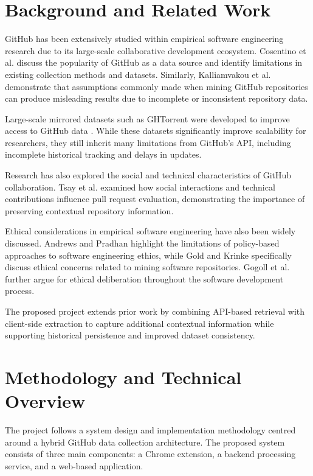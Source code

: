 \documentclass[conference]{IEEEtran}
\begin{document}
\section{Background and Related Work}
GitHub has been extensively studied within empirical software engineering research due to its large-scale collaborative development ecosystem. Cosentino et al. \cite{cosentino2016} discuss the popularity of GitHub as a data source and identify limitations in existing collection methods and datasets. Similarly, Kalliamvakou et al. \cite{kalliamvakou2016} demonstrate that assumptions commonly made when mining GitHub repositories can produce misleading results due to incomplete or inconsistent repository data.

Large-scale mirrored datasets such as GHTorrent were developed to improve access to GitHub data \cite{gousios2017}. While these datasets significantly improve scalability for researchers, they still inherit many limitations from GitHub's API, including incomplete historical tracking and delays in updates.

Research has also explored the social and technical characteristics of GitHub collaboration. Tsay et al. \cite{tsay2014} examined how social interactions and technical contributions influence pull request evaluation, demonstrating the importance of preserving contextual repository information.

Ethical considerations in empirical software engineering have also been widely discussed. Andrews and Pradhan \cite{andrews2001} highlight the limitations of policy-based approaches to software engineering ethics, while Gold and Krinke \cite{gold2022} specifically discuss ethical concerns related to mining software repositories. Gogoll et al. \cite{gogoll2021} further argue for ethical deliberation throughout the software development process.

The proposed project extends prior work by combining API-based retrieval with client-side extraction to capture additional contextual information while supporting historical persistence and improved dataset consistency.

\section{Methodology and Technical Overview}
The project follows a system design and implementation methodology centred around a hybrid GitHub data collection architecture. The proposed system consists of three main components: a Chrome extension, a backend processing service, and a web-based application.
\end{document}
